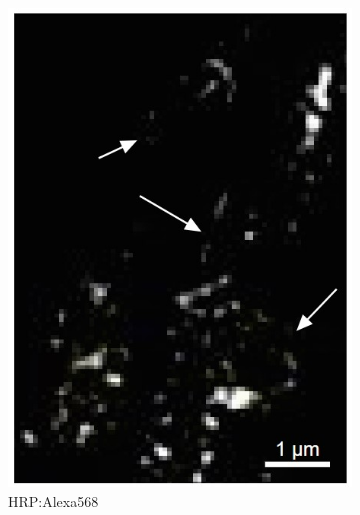 \begin{figure}
\begin{subfigure}[t]{0.235\textwidth}
		\includegraphics[width=\linewidth]{images/DeepSIM_NMJ_woAO_ROI1_Alexa568.jpg}
		\caption{HRP:Alexa568}
		\label{fig:DeepSIM_NMJ_woAO_ROI1_Alexa568}
	\end{subfigure}
	\begin{subfigure}[t]{0.24\textwidth}
		\centering

\end{subfigure}
\end{figure}
